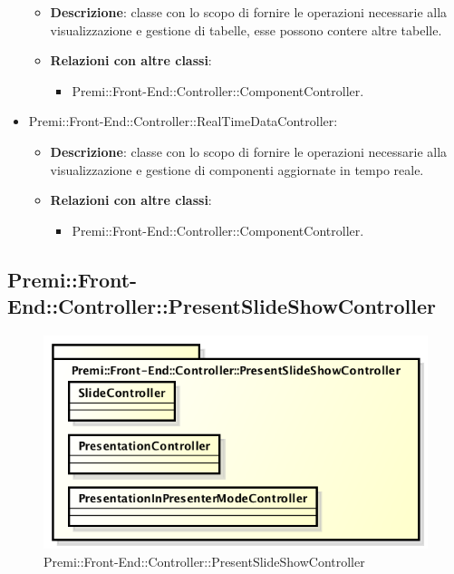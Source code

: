 \begin{itemize}
\begin{itemize}
				\item \textbf{Descrizione}: classe con lo scopo di fornire le operazioni necessarie alla visualizzazione e gestione di tabelle, esse possono contere altre tabelle.
				\item \textbf{Relazioni con altre classi}:
				\begin{itemize}
					\item Premi::Front-End::Controller::ComponentController.
				\end{itemize}
			\end{itemize}
		\item  Premi::Front-End::Controller::RealTimeDataController: 
			 \begin{itemize}
				\item \textbf{Descrizione}: classe con lo scopo di fornire le operazioni necessarie alla visualizzazione e gestione di componenti aggiornate in tempo reale.
				\item \textbf{Relazioni con altre classi}:
				\begin{itemize}
					\item Premi::Front-End::Controller::ComponentController.
				\end{itemize}
			\end{itemize}
			
		\end{itemize}
		
\newpage
\subsection{Premi::Front-End::Controller::PresentSlideShowController}
\begin{figure}[h]
\centering
\includegraphics[width=0.7\linewidth]{img/front-end_controller_presentslideshowcontroller}
\caption[Premi::Front-End::Controller::PresentSlideShowController]{Premi::Front-End::Controller::PresentSlideShowController}
\label{fig:front-end_controller_presentslideshowcontroller}
\end{figure}

